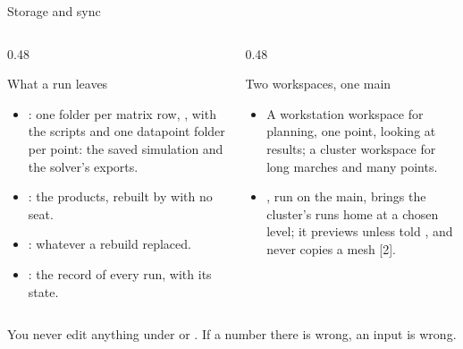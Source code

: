 \begin{frame}{Storage and sync}
\begin{columns}[T]
\begin{column}{0.48\textwidth}
\begin{block}{What a run leaves}
\begin{itemize}\small
  \item {}: one folder per matrix row, , with the
        scripts and one datapoint folder per point: the saved simulation and
        the solver's exports.
  \item {}: the products, rebuilt by  with no seat.
  \item {}: whatever a rebuild replaced.
  \item {}: the record of every run, with its state.
\end{itemize}
\end{block}
\end{column}
\begin{column}{0.48\textwidth}
\begin{block}{Two workspaces, one main}
\begin{itemize}\small
  \item A workstation workspace for planning, one point, looking at results;
        a cluster workspace for long marches and many points.
  \item {}, run on the main, brings the cluster's runs
        home at a chosen level; it previews unless told , and
        never copies a mesh [2].
\end{itemize}
\end{block}
\end{column}
\end{columns}
\begin{takeaway}You never edit anything under  or . If a
number there is wrong, an input is wrong.\end{takeaway}
\end{frame}

